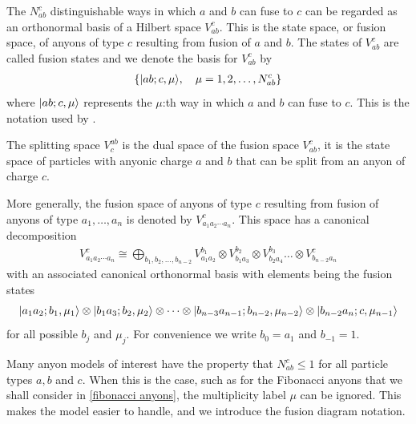 \documentclass[a4paper,10pt,oneside]{book}
\theoremstyle{plain}
\theoremstyle{definition}
\theoremstyle{remark}
\DeclarePairedDelimiter\ket{\lvert}{\rangle}
\begin{document}


The $N_{ab}^c$ distinguishable ways in which $a$ and $b$ can fuse to $c$ can be regarded as an orthonormal basis of a Hilbert space $V_{ab}^c$. This is the state space, or fusion space, of anyons of type $c$ resulting from fusion of $a$ and $b$. The states of $V_{ab}^c$ are called fusion states and we denote the basis for $V_{ab}^c$ by
\begin{align*}
  \{ \ket{ab;c,\mu}, \quad \mu = 1,2,\ldots,N_{ab}^c \}
\end{align*}
where $\ket{ab;c,\mu}$ represents the $\mu$:th way in which $a$ and $b$ can fuse to $c$. This is the notation used by \cite{preskill}.

The splitting space $V_c^{ab}$ is the dual space of the fusion space $V_{ab}^c$, it is the state space of particles with anyonic charge $a$ and $b$ that can be split from an anyon of charge $c$.

More generally, the fusion space of anyons of type $c$ resulting from fusion of anyons of type $a_1, \ldots, a_n$ is denoted by $V_{a_1 a_2 \cdots a_n}^c$. This space has a canonical decomposition
\begin{align*}
  V_{a_1 a_2 \cdots a_n}^c \cong \bigoplus_{b_1,b_2,\ldots,b_{n-2}} V_{a_1a_2}^{b_1} \otimes V_{b_1 a_3}^{b_2} \otimes V_{b_2 a_4}^{b_3} \ldots \otimes V_{b_{n-2} a_n}^c
\end{align*}
with an associated canonical orthonormal basis with elements being the fusion states
\begin{align*}
  \ket{a_1 a_2; b_1, \mu_1} \otimes \ket{b_1 a_3; b_2, \mu_2} \otimes \cdots \otimes \ket{b_{n-3} a_{n-1}; b_{n-2}, \mu_{n-2}} \otimes \ket{b_{n-2} a_n; c, \mu_{n-1}}
\end{align*}
for all possible $b_j$ and $\mu_j$. For convenience we write $b_{0} = a_1$ and $b_{-1} = 1$.

Many anyon models of interest have the property that $N_{ab}^c \le 1$ for all particle types $a, b$ and $c$. When this is the case, such as for the Fibonacci anyons that we shall consider in \cref{fibonacci anyons}, the multiplicity label $\mu$ can be ignored. This makes the model easier to handle, and we introduce the fusion diagram notation.
\end{document}
